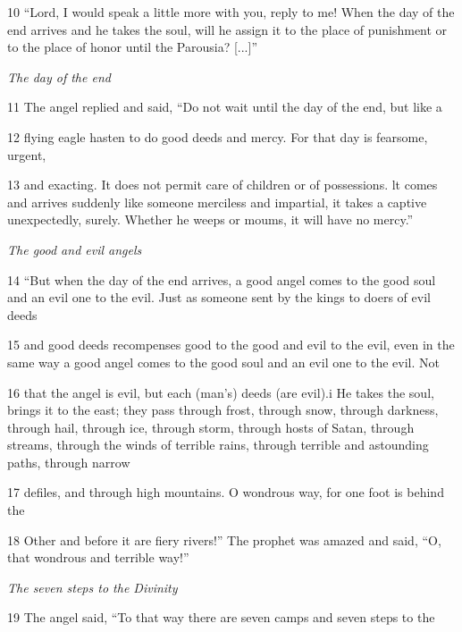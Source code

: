 \par 10 “Lord, I would speak a little more with you, reply to me! When the day of the end arrives and he takes the soul, will he assign it to the place of punishment or to the place of honor until the Parousia? [...]”

\par \textit{The day of the end}

\par 11 The angel replied and said, “Do not wait until the day of the end, but like a

\par 12 flying eagle hasten to do good deeds and mercy. For that day is fearsome, urgent,

\par 13 and exacting. It does not permit care of children or of possessions. lt comes and arrives suddenly like someone merciless and impartial, it takes a captive unexpectedly, surely. Whether he weeps or moums, it will have no mercy.”

\par \textit{The good and evil angels}

\par 14 “But when the day of the end arrives, a good angel comes to the good soul and an evil one to the evil. Just as someone sent by the kings to doers of evil deeds

\par 15 and good deeds recompenses good to the good and evil to the evil, even in the same way a good angel comes to the good soul and an evil one to the evil. Not

\par 16 that the angel is evil, but each (man's) deeds (are evil).i He takes the soul, brings it to the east; they pass through frost, through snow, through darkness, through hail, through ice, through storm, through hosts of Satan, through streams, through the winds of terrible rains, through terrible and astounding paths, through narrow

\par 17 defiles, and through high mountains. O wondrous way, for one foot is behind the

\par 18 Other and before it are fiery rivers!” The prophet was amazed and said, “O, that wondrous and terrible way!”

\par \textit{The seven steps to the Divinity}

\par 19 The angel said, “To that way there are seven camps and seven steps to the

